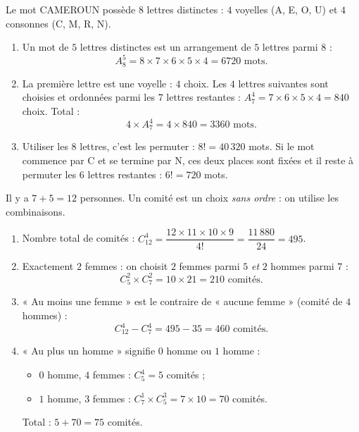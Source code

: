 \documentclass[11pt]{article}
\begin{document}
\begin{corrige}
Le mot CAMEROUN possède $8$ lettres distinctes : $4$ voyelles (A, E, O, U) et $4$ consonnes (C, M, R, N).
\begin{enumerate}
\item Un mot de $5$ lettres distinctes est un arrangement de $5$ lettres parmi $8$ :
\[ A_8^5 = 8 \times 7 \times 6 \times 5 \times 4 = 6720 \text{ mots}. \]
\item La première lettre est une voyelle : $4$ choix. Les $4$ lettres suivantes sont choisies et ordonnées parmi les $7$ lettres restantes : $A_7^4 = 7 \times 6 \times 5 \times 4 = 840$ choix. Total :
\[ 4 \times A_7^4 = 4 \times 840 = 3360 \text{ mots}. \]
\item Utiliser les $8$ lettres, c'est les permuter : $8! = 40\,320$ mots. Si le mot commence par C et se termine par N, ces deux places sont fixées et il reste à permuter les $6$ lettres restantes : $6! = 720$ mots.
\end{enumerate}
\end{corrige}

\begin{corrige}
Il y a $7 + 5 = 12$ personnes. Un comité est un choix \emph{sans ordre} : on utilise les combinaisons.
\begin{enumerate}
\item Nombre total de comités : $C_{12}^4 = \dfrac{12 \times 11 \times 10 \times 9}{4!} = \dfrac{11\,880}{24} = 495$.
\item Exactement $2$ femmes : on choisit $2$ femmes parmi $5$ \emph{et} $2$ hommes parmi $7$ :
\[ C_5^2 \times C_7^2 = 10 \times 21 = 210 \text{ comités}. \]
\item « Au moins une femme » est le contraire de « aucune femme » (comité de $4$ hommes) :
\[ C_{12}^4 - C_7^4 = 495 - 35 = 460 \text{ comités}. \]
\item « Au plus un homme » signifie $0$ homme ou $1$ homme :
\begin{itemize}
\item $0$ homme, $4$ femmes : $C_5^4 = 5$ comités ;
\item $1$ homme, $3$ femmes : $C_7^1 \times C_5^3 = 7 \times 10 = 70$ comités.
\end{itemize}
Total : $5 + 70 = 75$ comités.
\end{enumerate}
\end{corrige}
\end{document}
